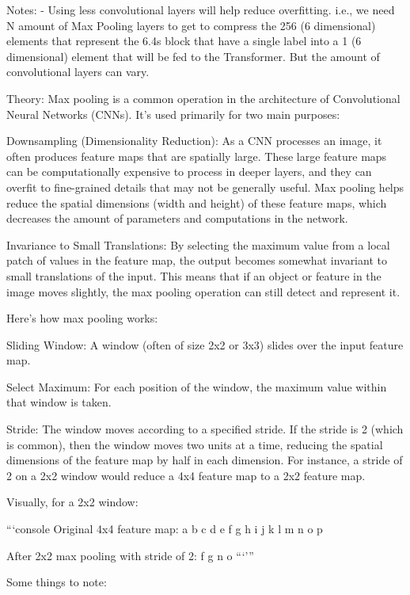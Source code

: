 Notes: 
- Using less convolutional layers will help reduce overfitting. i.e., we need N amount of 
Max Pooling layers to get to compress the 256 (6 dimensional) elements that represent the 6.4s block that 
have a single label into a 1 (6 dimensional) element that will be fed to the Transformer. But the amount of convolutional
layers can vary. 








Theory: 
Max pooling is a common operation in the architecture of Convolutional Neural Networks (CNNs). It's used primarily for two main purposes:

    Downsampling (Dimensionality Reduction): As a CNN processes an image, it often produces feature maps that are spatially large. These large feature maps can be computationally expensive to process in deeper layers, and they can overfit to fine-grained details that may not be generally useful. Max pooling helps reduce the spatial dimensions (width and height) of these feature maps, which decreases the amount of parameters and computations in the network.

    Invariance to Small Translations: By selecting the maximum value from a local patch of values in the feature map, the output becomes somewhat invariant to small translations of the input. This means that if an object or feature in the image moves slightly, the max pooling operation can still detect and represent it.

Here's how max pooling works:

    Sliding Window: A window (often of size 2x2 or 3x3) slides over the input feature map.

    Select Maximum: For each position of the window, the maximum value within that window is taken.

    Stride: The window moves according to a specified stride. If the stride is 2 (which is common), then the window moves two units at a time, reducing the spatial dimensions of the feature map by half in each dimension. For instance, a stride of 2 on a 2x2 window would reduce a 4x4 feature map to a 2x2 feature map.

Visually, for a 2x2 window:

```console
Original 4x4 feature map:
a b c d
e f g h
i j k l
m n o p

After 2x2 max pooling with stride of 2:
f g
n o
```'''


Some things to note:

